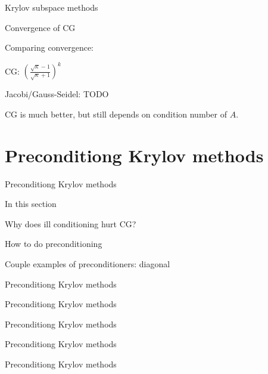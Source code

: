 \documentclass[18pt,xcolor=table]{beamer}
\begin{document}
\begin{frame}{Krylov subspace methods}
\begin{block}{Convergence of CG}
\bit
\item Comparing convergence:
\bit
\item CG: $\left(\frac{\sqrt{\kappa}-1}{\sqrt{\kappa}+1}\right)^k$
\item Jacobi/Gauss-Seidel: TODO
\eit
\item CG is much better, but still depends on condition number of $A$.
\eit
\end{block}
\end{frame}


\section{Preconditiong Krylov methods}

\begin{frame}{Preconditiong Krylov methods}
\begin{block}{In this section}
\bit
\item Why does ill conditioning hurt CG?
\item How to do preconditioning
\item Couple examples of preconditioners: diagonal
\eit
\end{block}
\end{frame}

\begin{frame}{Preconditiong Krylov methods}
\begin{block}{}
\bit
\item 
\eit
\end{block}
\end{frame}

\begin{frame}{Preconditiong Krylov methods}
\begin{block}{}
\bit
\item 
\eit
\end{block}
\end{frame}

\begin{frame}{Preconditiong Krylov methods}
\begin{block}{}
\bit
\item 
\eit
\end{block}
\end{frame}

\begin{frame}{Preconditiong Krylov methods}
\begin{block}{}
\bit
\item 
\eit
\end{block}
\end{frame}

\begin{frame}{Preconditiong Krylov methods}
\begin{block}{}
\bit
\item 
\eit
\end{block}
\end{frame}



\end{document}
